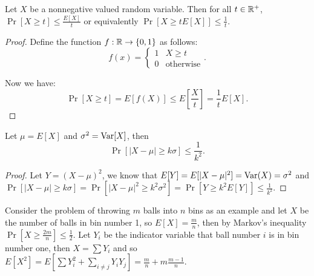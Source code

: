 \begin{theorem}
Let $X$ be a nonnegative valued random variable. Then for all $t \in \mathbb{R}^+$, $\Pr[X \geq t] \leq \frac{E[X]}{t}$ or equivalently $\Pr[X \geq t E[X]] \leq \frac{1}{t}$.
\end{theorem}
\begin{proof}
Define the function $f: \mathbb{R} \rightarrow \{0, 1\}$ as follows:
$$ f(x) = \left\{\begin{matrix}
1 & X \geq t \\
0 & \text{otherwise}
\end{matrix}\right..$$

Now we have:
$$\Pr[X \geq t] = E[f(X)] \leq E\left[\frac{X}{t}\right] = \frac{1}{t} E[X].$$

\end{proof}

\begin{theorem}
Let $\mu = E[X]$ and $\sigma^2 = \mathrm{Var}[X]$, then $$\Pr[\vert X - \mu \vert \geq k \sigma] \leq \frac{1}{k^2}.$$
\end{theorem}
\begin{proof}
Let $Y = (X - \mu)^2$, we know that $E[Y] = E[\vert X - \mu \vert ^2] = \mathrm{Var}(X) = \sigma^2$ and $\Pr[\vert X - \mu \vert \geq k \sigma] = \Pr[\vert X - \mu \vert^2 \geq k^2 \sigma^2] = \Pr[Y \geq k^2 E[Y]] \leq \frac{1}{k^2}.$
\end{proof}

Consider the problem of throwing $m$ balls into $n$ bins as an example and let $X$ be the number of balls in bin number 1, so $E[X] = \frac{m}{n}$, then by Markov's inequality $\Pr[X \geq \frac{2m}{n}] \leq \frac{1}{2}$. Let $Y_i$ be the indicator variable that ball number $i$ is in bin number one, then $X = \sum Y_i$ and so $E[X^2] = E[\sum Y_i^2 + \sum_{i \neq j} Y_i Y_j] = \frac{m}{n} + m \frac{m-1}{n}.$

